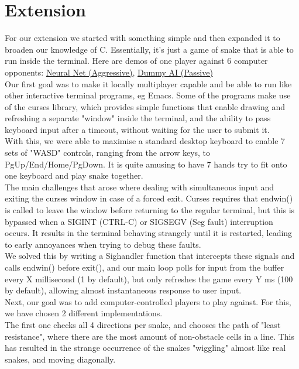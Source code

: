 \documentclass{article}
\begin{document}
\section{Extension}
For our extension we started with something simple and then expanded it to broaden our knowledge of C. Essentially, it's just a game of snake that is able to run inside the terminal. Here are demos of one player against 6 computer opponents: \href{https://drive.google.com/file/d/1kb40j-NwFqyENvUz85JHg8sGjtWNsq--/view?usp=sharing}{Neural Net (Aggressive)}, \href{https://drive.google.com/file/d/1hcnIAag5ITqvQSusgQt79IjGtT2RDb-E/view?usp=sharing}{Dummy AI (Passive)}\\

Our first goal was to make it locally multiplayer capable and be able to run like other interactive terminal programs, eg Emacs. Some of the programs make use of the curses library, which provides simple functions that enable drawing and refreshing a separate "window" inside the terminal, and the ability to pass keyboard input after a timeout, without waiting for the user to submit it.\\

With this, we were able to maximise a standard desktop keyboard to enable 7 sets of "WASD" controls, ranging from the arrow keys, to PgUp/End/Home/PgDown. It is quite amusing to have 7 hands try to fit onto one keyboard and play snake together.\\

The main challenges that arose where dealing with simultaneous input and exiting the curses window in case of a forced exit. Curses requires that endwin() is called to leave the window before returning to the regular terminal, but this is bypassed when a SIGINT (CTRL-C) or SIGSEGV (Seg fault) interruption occurs. It results in the terminal behaving strangely until it is restarted, leading to early annoyances when trying to debug these faults.\\
We solved this by writing a Sighandler function that intercepts these signals and calls endwin() before exit(), and our main loop polls for input from the buffer every X millisecond (1 by default), but only refreshes the game every Y ms (100 by default), allowing almost instantaneous response to user input.\\

Next, our goal was to add computer-controlled players to play against. For this, we have chosen 2 different implementations.\\
The first one checks all 4 directions per snake, and chooses the path of "least resistance", where there are the most amount of non-obstacle cells in a line. This has resulted in the strange occurrence of the snakes "wiggling" almost like real snakes, and moving diagonally.\\
\end{document}
